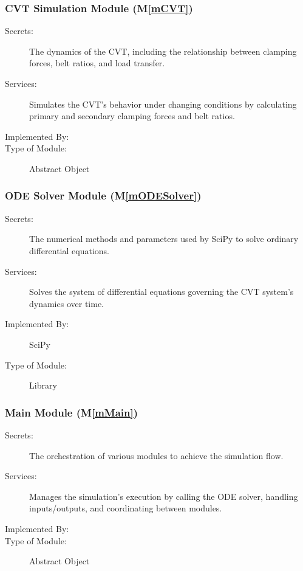 \documentclass[12pt, titlepage]{article}
\newcommand{\mref}[1]{M\ref{#1}}
\begin{document}
\subsubsection{CVT Simulation Module (\mref{mCVT})}

\begin{description}
\item[Secrets:] The dynamics of the CVT, including the relationship between clamping forces, belt ratios, and load transfer.
\item[Services:] Simulates the CVT's behavior under changing conditions by calculating primary and secondary clamping forces and belt ratios.
\item[Implemented By:] \progname{}
\item[Type of Module:] Abstract Object
\end{description}


\subsubsection{ODE Solver Module (\mref{mODESolver})}

\begin{description}
\item[Secrets:] The numerical methods and parameters used by SciPy to solve ordinary differential equations.
\item[Services:] Solves the system of differential equations governing the CVT system's dynamics over time.
\item[Implemented By:] SciPy
\item[Type of Module:] Library
\end{description}

\subsubsection{Main Module (\mref{mMain})}

\begin{description}
\item[Secrets:] The orchestration of various modules to achieve the simulation flow.
\item[Services:] Manages the simulation's execution by calling the ODE solver, handling inputs/outputs, and coordinating between modules.
\item[Implemented By:] \progname{}
\item[Type of Module:] Abstract Object
\end{description}
\end{document}

